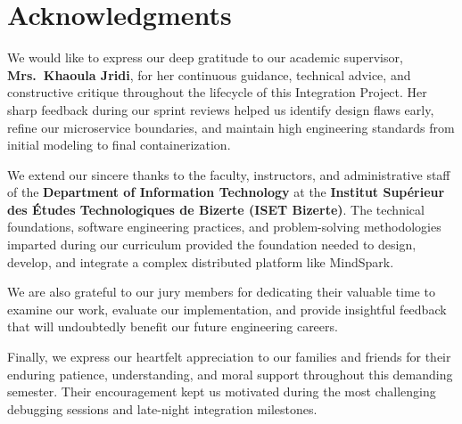 \chapter*{Acknowledgments}

We would like to express our deep gratitude to our academic supervisor, \textbf{Mrs.~Khaoula Jridi}, for her continuous guidance, technical advice, and constructive critique throughout the lifecycle of this Integration Project. Her sharp feedback during our sprint reviews helped us identify design flaws early, refine our microservice boundaries, and maintain high engineering standards from initial modeling to final containerization.

We extend our sincere thanks to the faculty, instructors, and administrative staff of the \textbf{Department of Information Technology} at the \textbf{Institut Supérieur des Études Technologiques de Bizerte (ISET Bizerte)}. The technical foundations, software engineering practices, and problem-solving methodologies imparted during our curriculum provided the foundation needed to design, develop, and integrate a complex distributed platform like MindSpark.

We are also grateful to our jury members for dedicating their valuable time to examine our work, evaluate our implementation, and provide insightful feedback that will undoubtedly benefit our future engineering careers.

Finally, we express our heartfelt appreciation to our families and friends for their enduring patience, understanding, and moral support throughout this demanding semester. Their encouragement kept us motivated during the most challenging debugging sessions and late-night integration milestones.
